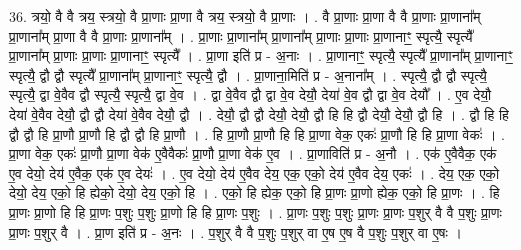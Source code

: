 \documentclass[17pt]{extarticle}
\begin{document}
36. त्रयो॒ वै वै त्रय॒ स्त्रयो॒ वै प्रा॒णाः प्रा॒णा वै त्रय॒ स्त्रयो॒ वै प्रा॒णाः । . वै प्रा॒णाः प्रा॒णा वै वै प्रा॒णाः प्रा॒णाना᳚म् प्रा॒णाना᳚म् प्रा॒णा वै वै प्रा॒णाः प्रा॒णाना᳚म् । . प्रा॒णाः प्रा॒णाना᳚म् प्रा॒णाना᳚म् प्रा॒णाः प्रा॒णाः प्रा॒णानाꣳ॒॒ स्पृत्यै॒ स्पृत्यै᳚ प्रा॒णाना᳚म् प्रा॒णाः प्रा॒णाः प्रा॒णानाꣳ॒॒ स्पृत्यै᳚ । . प्रा॒णा इति॑ प्र - अ॒नाः । . प्रा॒णानाꣳ॒॒ स्पृत्यै॒ स्पृत्यै᳚ प्रा॒णाना᳚म् प्रा॒णानाꣳ॒॒ स्पृत्यै॒ द्वौ द्वौ स्पृत्यै᳚ प्रा॒णाना᳚म् प्रा॒णानाꣳ॒॒ स्पृत्यै॒ द्वौ । . प्रा॒णाना॒मिति॑ प्र - अ॒नाना᳚म् । . स्पृत्यै॒ द्वौ द्वौ स्पृत्यै॒ स्पृत्यै॒ द्वा वे॒वैव द्वौ स्पृत्यै॒ स्पृत्यै॒ द्वा वे॒व । . द्वा वे॒वैव द्वौ द्वा वे॒व देयौ॒ देया॑ वे॒व द्वौ द्वा वे॒व देयौ᳚ । . ए॒व देयौ॒ देया॑ वे॒वैव देयौ॒ द्वौ द्वौ देया॑ वे॒वैव देयौ॒ द्वौ । . देयौ॒ द्वौ द्वौ देयौ॒ देयौ॒ द्वौ हि हि द्वौ देयौ॒ देयौ॒ द्वौ हि । . द्वौ हि हि द्वौ द्वौ हि प्रा॒णौ प्रा॒णौ हि द्वौ द्वौ हि प्रा॒णौ । . हि प्रा॒णौ प्रा॒णौ हि हि प्रा॒णा वेक॒ एकः॑ प्रा॒णौ हि हि प्रा॒णा वेकः॑ । . प्रा॒णा वेक॒ एकः॑ प्रा॒णौ प्रा॒णा वेक॑ ए॒वैवैकः॑ प्रा॒णौ प्रा॒णा वेक॑ ए॒व । . प्रा॒णाविति॑ प्र - अ॒नौ । . एक॑ ए॒वैवैक॒ एक॑ ए॒व देयो॒ देय॑ ए॒वैक॒ एक॑ ए॒व देयः॑ । . ए॒व देयो॒ देय॑ ए॒वैव देय॒ एक॒ एको॒ देय॑ ए॒वैव देय॒ एकः॑ । . देय॒ एक॒ एको॒ देयो॒ देय॒ एको॒ हि ह्येको॒ देयो॒ देय॒ एको॒ हि । . एको॒ हि ह्येक॒ एको॒ हि प्रा॒णः प्रा॒णो ह्येक॒ एको॒ हि प्रा॒णः । . हि प्रा॒णः प्रा॒णो हि हि प्रा॒णः प॒शुः प॒शुः प्रा॒णो हि हि प्रा॒णः प॒शुः । . प्रा॒णः प॒शुः प॒शुः प्रा॒णः प्रा॒णः प॒शुर् वै वै प॒शुः प्रा॒णः प्रा॒णः प॒शुर् वै । . प्रा॒ण इति॑ प्र - अ॒नः । . प॒शुर् वै वै प॒शुः प॒शुर् वा ए॒ष ए॒ष वै प॒शुः प॒शुर् वा ए॒षः । \newline
\pagebreak
{}
\end{document}
